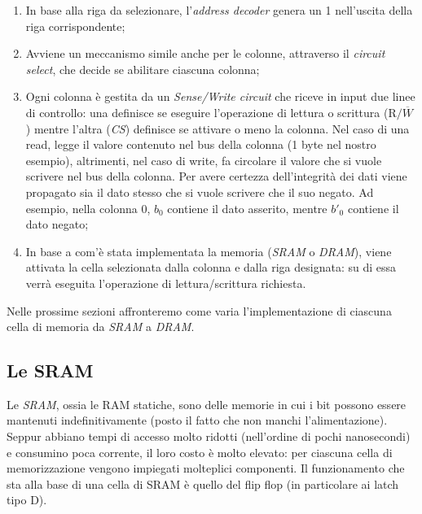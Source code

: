 \documentclass[class=book, crop=false, oneside]{standalone}
\begin{document}
\begin{enumerate}
	\item In base alla riga da selezionare, l'\emph{address decoder} genera un 1 nell'uscita della riga corrispondente;
	\item Avviene un meccanismo simile anche per le colonne, attraverso il \emph{circuit select}, che decide se abilitare ciascuna colonna;
	\item Ogni colonna è gestita da un \emph{Sense/Write circuit} che riceve in input due linee di controllo: una definisce se eseguire l'operazione di lettura o scrittura (\emph{\(\textrm{R/}\overline{W}\)}) mentre l'altra (\emph{CS}) definisce se attivare o meno la colonna. Nel caso di una read, legge il valore contenuto nel bus della colonna (1 byte nel nostro esempio), altrimenti, nel caso di write, fa circolare il valore che si vuole scrivere nel bus della colonna. Per avere certezza dell'integrità dei dati viene propagato sia il dato stesso che si vuole scrivere che il suo negato. Ad esempio, nella colonna 0, \(b_0\) contiene il dato asserito, mentre \(b'_0\) contiene il dato negato;
	\item In base a com'è stata implementata la memoria (\emph{SRAM} o \emph{DRAM}), viene attivata la cella selezionata dalla colonna e dalla riga designata: su di essa verrà eseguita l'operazione di lettura/scrittura richiesta.
\end{enumerate}

Nelle prossime sezioni affronteremo come varia l'implementazione di ciascuna cella di memoria da \emph{SRAM} a \emph{DRAM}.

\subsection{Le SRAM}
Le \emph{SRAM}, ossia le RAM statiche, sono delle memorie in cui i bit possono essere mantenuti indefinitivamente (posto il fatto che non manchi l'alimentazione). Seppur abbiano tempi di accesso molto ridotti (nell'ordine di pochi nanosecondi) e consumino poca corrente, il loro costo è molto elevato: per ciascuna cella di memorizzazione vengono impiegati molteplici componenti.
Il funzionamento che sta alla base di una cella di SRAM è quello del flip flop (in particolare ai latch tipo D).
\end{document}
